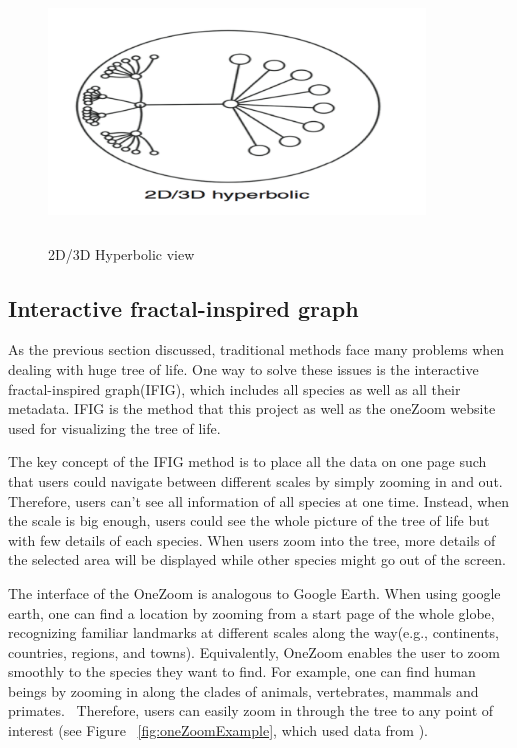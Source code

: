 \documentclass[MSc]{icldt}
\begin{document}
\begin{itemize}
  \begin{figure}[H]
  \centering
  \includegraphics [width=10cm,height=6.8cm]{Hyperbolic}
  \caption{2D/3D Hyperbolic view}
  \label{fig:Hyperbolic}
\end{figure}

\end{itemize}


\subsection{Interactive fractal-inspired graph}

As the previous section discussed, traditional methods face many problems when dealing with huge tree of life. One way to solve these issues is the interactive fractal-inspired graph(IFIG), which includes all species as well as all their metadata. IFIG is the method that this project as well as the oneZoom website used for visualizing the tree of life. 

The key concept of the IFIG method is to place all the data on one page such that users could navigate between different scales by simply zooming in and out.\cite{oneZoomWebsite} Therefore, users can't see all information of all species at one time. Instead, when the scale is big enough, users could see the whole picture of the tree of life but with few details of each species. When users zoom into the tree, more details of the selected area will be displayed while other species might go out of the screen.

The interface of the OneZoom is analogous to Google Earth. When using google earth, one can find a location by zooming from a start page of the whole globe, recognizing familiar landmarks at different scales along the way(e.g., continents, countries, regions, and towns).\cite{oneZoom} Equivalently, OneZoom enables the user to zoom smoothly to the species they want to find. For example, one can find human beings by zooming in along the clades of animals, vertebrates, mammals and primates.~\cite{oneZoom} Therefore, users can easily zoom in through the tree to any point of interest (see Figure ~\ref{fig:oneZoomExample}, which used data from \cite{dataForOneZoom}).
\end{document}
